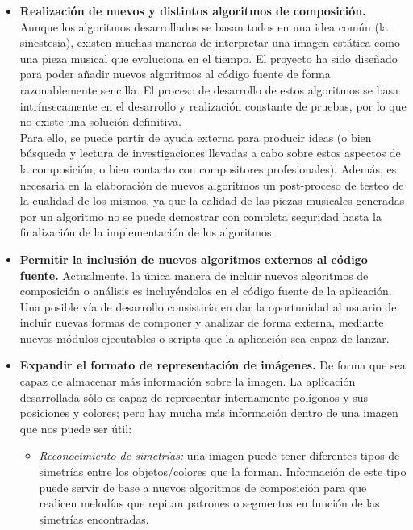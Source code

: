 \begin{itemize}

\item\textbf{Realización de nuevos y distintos algoritmos de composición.} Aunque los algoritmos desarrollados se basan todos en una idea común (la sinestesia), existen muchas maneras de interpretar una imagen estática como una pieza musical que evoluciona en el tiempo. El proyecto ha sido diseñado para poder añadir nuevos algoritmos
al código fuente de forma razonablemente sencilla. El proceso de desarrollo de estos algoritmos se basa intrínsecamente en el desarrollo y realización constante de pruebas, por lo que no existe una solución definitiva.\\

Para ello, se puede partir de ayuda externa para producir ideas (o bien búsqueda y lectura de investigaciones llevadas a cabo sobre estos aspectos de la composición, o bien contacto con compositores profesionales). Además, es necesaria en la elaboración de nuevos algoritmos un post-proceso de testeo de la cualidad de los mismos, ya que la calidad de las piezas musicales generadas por un algoritmo no se puede demostrar con completa seguridad hasta la finalización de la implementación de los algoritmos.

\item\textbf{Permitir la inclusión de nuevos algoritmos externos al código fuente.} Actualmente, la única manera de incluir nuevos algoritmos de composición o análisis es incluyéndolos en el código fuente de la aplicación. Una posible vía de desarrollo consistiría en dar la oportunidad al usuario de incluir nuevas formas de componer y analizar de forma externa, mediante nuevos módulos ejecutables o scripts que la aplicación sea capaz de lanzar.\\

\item\textbf{Expandir el formato de representación de imágenes.} De forma que sea capaz de almacenar más información sobre la imagen. La aplicación desarrollada sólo es capaz de representar internamente polígonos y sus posiciones y colores; pero hay mucha más información dentro de una imagen que nos puede ser útil:

	\begin{itemize}
	
		\item\textit{Reconocimiento de simetrías:} una imagen puede tener diferentes tipos de simetrías entre los objetos/colores que la forman. Información de este tipo puede servir de base a nuevos algoritmos de composición para que realicen melodías que repitan patrones o segmentos en función de las simetrías encontradas.
		

\end{itemize}
\end{itemize}
